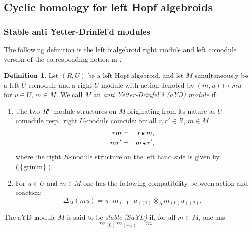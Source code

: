 \documentclass[reqno, a4paper, 10pt]{amsart}
\numberwithin{equation}{section}
\theoremstyle{plain}
\theoremstyle{definition}
\newtheorem{dfn}[theorem]{Definition}
\theoremstyle{remark}
\begin{document}
\subsection{Cyclic homology for left Hopf algebroids}

\subsubsection{Stable anti Yetter-Drinfel'd modules}

The following definition is the left
bialgebroid right module and left
comodule version of the corresponding notion in
\cite{BoeSte:CCOBAAVC, HajKhaRanSom:SAYD}. 

\begin{dfn}
\label{SAYD}
Let $(R, U)$ be a left Hopf algebroid, and let
 $M$ simultaneously be a left
 $U$-comodule and a right $U$-module with
 action denoted by $(m, u) \mapsto mu$
 for $u \in U$, $m \in M$. We call $M$
 an {\em anti Yetter-Drinfel'd (aYD)
 module} if: 
\begin{enumerate}
\item
The two ${{R^{\rm e}}}$-module structures on $M$ originating from its nature as $U$-comodule resp.\ right $U$-module coincide:
for all $r, r' \in R$, $m \in M$
\begin{eqnarray}
\label{campanilla1}
rm &=& r {{\,\raise1pt\hbox{$\scriptscriptstyle{\blacktriangleright}$} \, }} m, \\
\label{campanilla2}
mr' &=& m {{\,\raise1pt\hbox{$\scriptscriptstyle{\blacktriangleleft}$} \, }} r',
\end{eqnarray}
where the right $R$-module structure on the left hand side is given by {{\rm (}\ref{{grimm}}{\rm )}}. 
\item
For $u \in U$ and $m \in M$ one has the following compatibility between action and coaction:
\begin{equation}
\label{huhomezone}
		  {\Delta}_{{\scriptscriptstyle{M}}}(mu) = 
		  u_- m_{(-1)} u_{+(1)} \otimes_{{\scriptscriptstyle{R}}} m_{(0)} u_{+(2)}.
\end{equation}
\end{enumerate}
The aYD module $M$ is
 said to be {\em stable (SaYD)} if, 
for all $m \in M$, one has
\begin{equation}
\label{Eq:SaYD}
m_{(0)}m_{(-1)} = m.
\end{equation}
\end{dfn}
\end{document}
